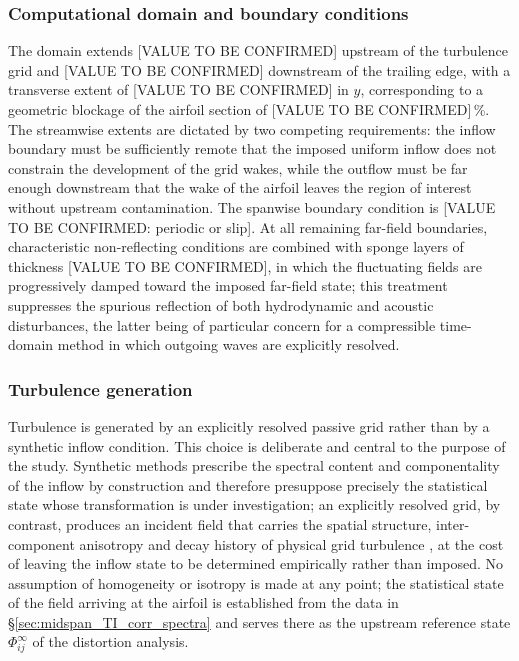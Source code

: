 \documentclass[lineno]{JFM-FLM_Au}
\begin{document}
\subsubsection{Computational domain and boundary conditions}

The domain extends [VALUE TO BE CONFIRMED] upstream of the turbulence
grid and [VALUE TO BE CONFIRMED] downstream of the trailing edge, with a
transverse extent of [VALUE TO BE CONFIRMED] in $y$, corresponding to a
geometric blockage of the airfoil section of
[VALUE TO BE CONFIRMED]\,\%. The streamwise extents are dictated by two
competing requirements: the inflow boundary must be sufficiently remote
that the imposed uniform inflow does not constrain the development of
the grid wakes, while the outflow must be far enough downstream that the
wake of the airfoil leaves the region of interest without upstream
contamination. The spanwise boundary condition is
[VALUE TO BE CONFIRMED: periodic or slip]. At all remaining far-field
boundaries, characteristic non-reflecting conditions are combined with
sponge layers of thickness [VALUE TO BE CONFIRMED], in which the
fluctuating fields are progressively damped toward the imposed far-field
state; this treatment suppresses the spurious reflection of both
hydrodynamic and acoustic disturbances, the latter being of particular
concern for a compressible time-domain method in which outgoing waves
are explicitly resolved.

\subsubsection{Turbulence generation}

Turbulence is generated by an explicitly resolved passive grid rather
than by a synthetic inflow condition. This choice is deliberate and
central to the purpose of the study. Synthetic methods prescribe the
spectral content and componentality of the inflow by construction and
therefore presuppose precisely the statistical state whose
transformation is under investigation; an explicitly resolved grid, by
contrast, produces an incident field that carries the spatial structure,
inter-component anisotropy and decay history of physical grid turbulence
\citep{ComteBellotCorrsin1971,Roach1987}, at the cost of leaving the
inflow state to be determined empirically rather than imposed. No
assumption of homogeneity or isotropy is made at any point; the
statistical state of the field arriving at the airfoil is established
from the data in \S\ref{sec:midspan_TI_corr_spectra} and serves there as
the upstream reference state $\Phi^{\infty}_{ij}$ of the distortion
analysis.
\end{document}
